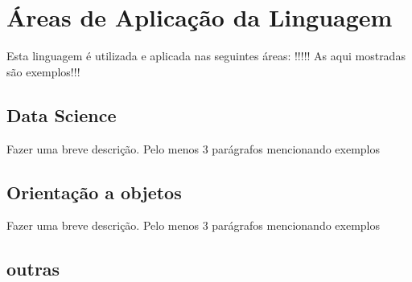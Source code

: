    \section{\'{A}reas de Aplica\c{c}\~{a}o da Linguagem}
   Esta linguagem \'{e} utilizada e aplicada nas seguintes \'{a}reas: !!!!! As aqui mostradas s\~{a}o exemplos!!!

        \subsection{ Data Science}
        Fazer uma breve descri\c{c}\~{a}o. Pelo menos 3 par\'{a}grafos mencionando exemplos

        \subsection{ Orienta\c{c}\~{a}o a objetos}
        Fazer uma breve descri\c{c}\~{a}o. Pelo menos 3 par\'{a}grafos mencionando exemplos

        \subsection{ outras} 
